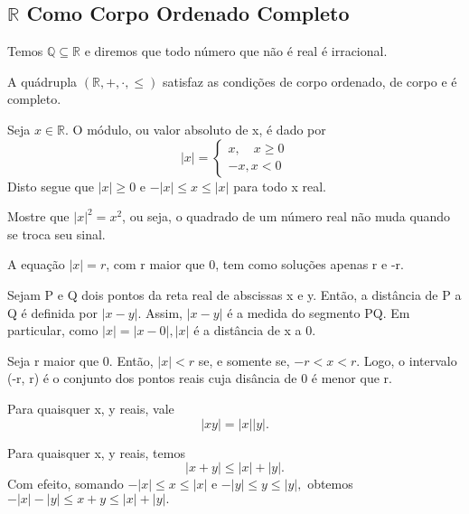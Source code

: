 \documentclass[analysis_notes.tex]{subfiles}
\begin{document}
\subsection{$\mathbb{R}$ Como Corpo Ordenado Completo}
Temos $\mathbb{Q}\subseteq{\mathbb{R}}$ e diremos que todo n\'umero que n\~ao \'e real \'e irracional.
\begin{theorem*}
	A qu\'adrupla $(\mathbb{R}, +, \cdot, \leq)$ satisfaz as condi\c c\~oes de corpo ordenado, de corpo e \'e completo.
\end{theorem*}
\begin{def*}
	Seja $x\in \mathbb{R}.$ O m\'odulo, ou valor absoluto de x, \'e dado por
	$$
		|x| = \left\{\begin{array}{ll}
			x, \quad x \geq 0 \\
			-x, x < 0
		\end{array}\right.
	$$
	Disto segue que $|x|\geq 0$ e $-|x|\leq x\leq |x|$ para todo x real.
\end{def*}
\begin{example}
	Mostre que $|x|^2 = x^2$, ou seja, o quadrado de um n\'umero real n\~ao muda quando se troca seu sinal.
\end{example}
\begin{example}
	A equa\c c\~ao $|x| = r$, com r maior que 0, tem como solu\c c\~oes apenas r e -r.
\end{example}
Sejam P e Q dois pontos da reta real de abscissas x e y. Ent\~ao, a dist\^ancia de P a Q \'e definida por $|x-y|$. Assim,
$|x-y|$ \'e a medida do segmento PQ. Em particular, como $|x|=|x-0|, |x|$ \'e a dist\^ancia de x a 0.
\begin{example}
	Seja r maior que 0. Ent\~ao, $|x| < r$ se, e somente se, $-r < x < r.$ Logo, o intervalo (-r, r) \'e o conjunto dos pontos reais
	cuja dis\^ancia de 0 \'e menor que r.
\end{example}
\begin{example}
	Para quaisquer x, y reais, vale
	$$
		|xy| = |x||y|.
	$$
\end{example}
\begin{example}
	Para quaisquer x, y reais, temos
	$$
		|x+y| \leq |x| + |y|.
	$$
	Com efeito, somando $-|x|\leq{x}\leq{|x|}$ e $-|y|\leq{y}\leq{|y|},$ obtemos $-|x|-|y|\leq{x + y}\leq{|x|+|y|.}$\qedsymbol
\end{example}
\end{document}
